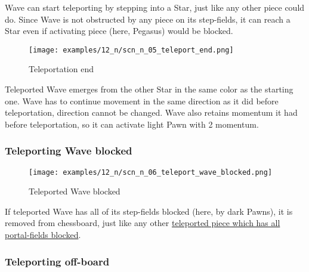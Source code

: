 Wave can start teleporting by stepping into a Star, just like any other piece could
do. Since Wave is not obstructed by any piece on its step-fields, it can reach a Star
even if activating piece (here, Pegasus) would be blocked.

\clearpage %

\vspace*{-2.0\baselineskip}
\noindent
\begin{figure}[!h]
\texttt{[image: examples/12\_n/scn\_n\_05\_teleport\_end.png]}
\caption{Teleportation end}
\label{fig:scn_n_05_teleport_end}
\end{figure}

Teleported Wave emerges from the other Star in the same color as the starting one.
Wave has to continue movement in the same direction as it did before teleportation,
direction cannot be changed. Wave also retains momentum it had before teleportation,
so it can activate light Pawn with 2 momentum.

\clearpage %

\subsubsection*{Teleporting Wave blocked}
\label{sec:Nineteen/Star/Teleporting pieces/Teleporting Wave blocked}

\vspace*{-1.0\baselineskip}
\noindent
\begin{figure}[!h]
\texttt{[image: examples/12\_n/scn\_n\_06\_teleport\_wave\_blocked.png]}
\caption{Teleported Wave blocked}
\label{fig:scn_n_06_teleport_wave_blocked}
\end{figure}

If teleported Wave has all of its step-fields blocked (here, by dark Pawns), it is
removed from chessboard, just like any other
\hyperref[fig:scn_n_03_teleport_move_2]{teleported piece which has all portal-fields blocked}.

\clearpage %

\subsubsection*{Teleporting off-board}
\label{sec:Nineteen/Star/Teleporting pieces/Teleporting off-board}

